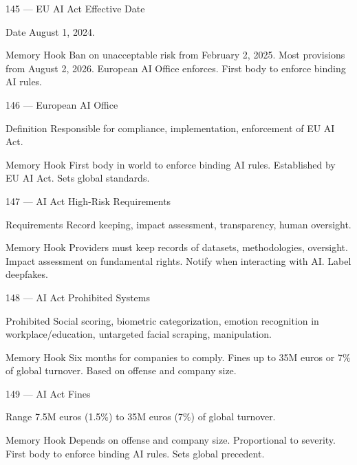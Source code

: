 \documentclass[aspectratio=169,8pt]{beamer}
\begin{document}
	\begin{frame}{145 --- EU AI Act Effective Date}
		\begin{block}{Date}
			August 1, 2024.
		\end{block}
		\begin{block}{Memory Hook}
			Ban on unacceptable risk from February 2, 2025. Most provisions from August 2, 2026. European AI Office enforces. First body to enforce binding AI rules.
		\end{block}
	\end{frame}
	
	\begin{frame}{146 --- European AI Office}
		\begin{block}{Definition}
			Responsible for compliance, implementation, enforcement of EU AI Act.
		\end{block}
		\begin{block}{Memory Hook}
			First body in world to enforce binding AI rules. Established by EU AI Act. Sets global standards.
		\end{block}
	\end{frame}
	
	\begin{frame}{147 --- AI Act High-Risk Requirements}
		\begin{block}{Requirements}
			Record keeping, impact assessment, transparency, human oversight.
		\end{block}
		\begin{block}{Memory Hook}
			Providers must keep records of datasets, methodologies, oversight. Impact assessment on fundamental rights. Notify when interacting with AI. Label deepfakes.
		\end{block}
	\end{frame}
	
	\begin{frame}{148 --- AI Act Prohibited Systems}
		\begin{block}{Prohibited}
			Social scoring, biometric categorization, emotion recognition in workplace/education, untargeted facial scraping, manipulation.
		\end{block}
		\begin{block}{Memory Hook}
			Six months for companies to comply. Fines up to 35M euros or 7\% of global turnover. Based on offense and company size.
		\end{block}
	\end{frame}
	
	\begin{frame}{149 --- AI Act Fines}
		\begin{block}{Range}
			7.5M euros (1.5\%) to 35M euros (7\%) of global turnover.
		\end{block}
		\begin{block}{Memory Hook}
			Depends on offense and company size. Proportional to severity. First body to enforce binding AI rules. Sets global precedent.
		\end{block}
	\end{frame}
	
\end{document}
